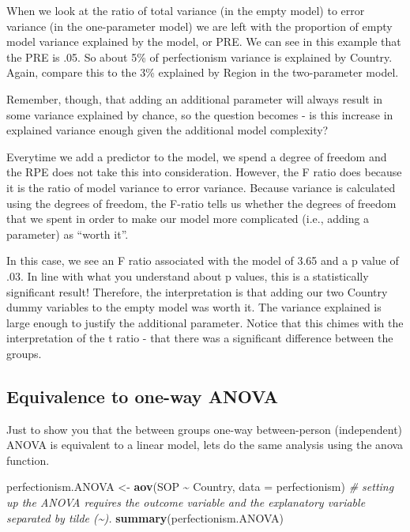 \documentclass[
]{article}
\newenvironment{Shaded}{\begin{snugshade}}{\end{snugshade}}
\newcommand{\AttributeTok}[1]{\textcolor[rgb]{0.13,0.29,0.53}{#1}}
\newcommand{\CommentTok}[1]{\textcolor[rgb]{0.56,0.35,0.01}{\textit{#1}}}
\newcommand{\FunctionTok}[1]{\textcolor[rgb]{0.13,0.29,0.53}{\textbf{#1}}}
\newcommand{\NormalTok}[1]{#1}
\newcommand{\OtherTok}[1]{\textcolor[rgb]{0.56,0.35,0.01}{#1}}
\newcommand{\SpecialCharTok}[1]{\textcolor[rgb]{0.81,0.36,0.00}{\textbf{#1}}}
\begin{document}
When we look at the ratio of total variance (in the empty model) to
error variance (in the one-parameter model) we are left with the
proportion of empty model variance explained by the model, or PRE. We
can see in this example that the PRE is .05. So about 5\% of
perfectionism variance is explained by Country. Again, compare this to
the 3\% explained by Region in the two-parameter model.

Remember, though, that adding an additional parameter will always result
in some variance explained by chance, so the question becomes - is this
increase in explained variance enough given the additional model
complexity?

Everytime we add a predictor to the model, we spend a degree of freedom
and the RPE does not take this into consideration. However, the F ratio
does because it is the ratio of model variance to error variance.
Because variance is calculated using the degrees of freedom, the F-ratio
tells us whether the degrees of freedom that we spent in order to make
our model more complicated (i.e., adding a parameter) as ``worth it''.

In this case, we see an F ratio associated with the model of 3.65 and a
p value of .03. In line with what you understand about p values, this is
a statistically significant result! Therefore, the interpretation is
that adding our two Country dummy variables to the empty model was worth
it. The variance explained is large enough to justify the additional
parameter. Notice that this chimes with the interpretation of the t
ratio - that there was a significant difference between the groups.

\subsection{Equivalence to one-way
ANOVA}\label{equivalence-to-one-way-anova}

Just to show you that the between groups one-way between-person
(independent) ANOVA is equivalent to a linear model, lets do the same
analysis using the anova function.

\begin{Shaded}
\begin{Highlighting}[]
\NormalTok{perfectionism.ANOVA }\OtherTok{\textless{}{-}} \FunctionTok{aov}\NormalTok{(SOP }\SpecialCharTok{\textasciitilde{}}\NormalTok{ Country, }\AttributeTok{data =}\NormalTok{ perfectionism) }\CommentTok{\# setting up the ANOVA requires the outcome variable and the explanatory variable separated by tilde (\textasciitilde{}).}
\FunctionTok{summary}\NormalTok{(perfectionism.ANOVA) }
\end{Highlighting}
\end{Shaded}
\end{document}
